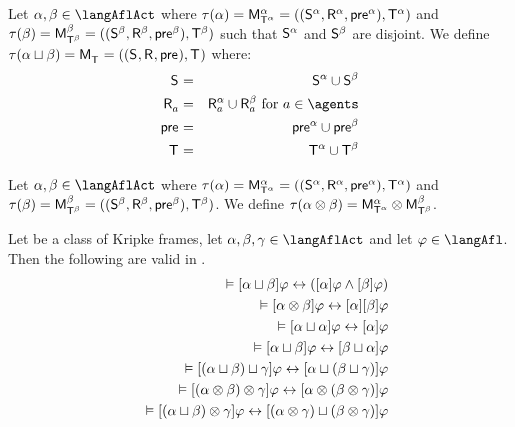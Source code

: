 \begin{definition}\label{afl-choice}
Let $\alpha, \beta \in \langAflAct$ where $\tau(\alpha) = \aPModel[\alpha]{\aStatesT[\alpha]} = \aPModelTuple[\alpha]{\aStatesT[\alpha]}$ and $\tau(\beta) = \aPModel[\beta]{\aStatesT[\beta]} = \aPModelTuple[\beta]{\aStatesT[\beta]}$ such that $\aStates[\alpha]$ and $\aStates[\beta]$ are disjoint.
We define $\tau(\alpha \choice \beta) = \aPModel{\aStatesT} = \aPModelTuple{\aStatesT}$ where:
\begin{eqnarray*}
    \aStates &=& \aStates[\alpha] \cup \aStates[\beta]\\
    \aAccessibility{\agentA} &=& \aAccessibility[\alpha]{\agentA} \cup \aAccessibility[\beta]{\agentA} \text{ for } \agentA \in \agents\\
    \aPrecondition &=& \aPrecondition[\alpha] \cup \aPrecondition[\beta]\\
    \aStatesT &=& \aStatesT[\alpha] \cup \aStatesT[\beta]
\end{eqnarray*}
\end{definition}

\begin{definition}\label{afl-sequential}
Let $\alpha, \beta \in \langAflAct$ where $\tau(\alpha) = \aPModel[\alpha]{\aStatesT[\alpha]} = \aPModelTuple[\alpha]{\aStatesT[\alpha]}$ and $\tau(\beta) = \aPModel[\beta]{\aStatesT[\beta]} = \aPModelTuple[\beta]{\aStatesT[\beta]}$.
We define $\tau(\alpha \compose \beta) = \aPModel[\alpha]{\aStatesT[\alpha]} \exec \aPModel[\beta]{\aStatesT[\beta]}$.
\end{definition}

\begin{proposition}\label{afl-choice-sequential-validities}
Let \classC{} be a class of Kripke frames, let $\alpha, \beta, \gamma \in \langAflAct$ and let $\phi \in \langAfl$. Then the following are valid in \logicAflC{}.
\begin{eqnarray*}
    &&\entails \actionA{\alpha \choice \beta} \phi \iff (\actionA{\alpha} \phi \land \actionA{\beta} \phi) \label{afl-axiom-choice}\\
    &&\entails \actionA{\alpha \compose \beta} \phi \iff \actionA{\alpha} \actionA{\beta} \phi \label{afl-axiom-sequential}\\
    &&\entails \actionA{\alpha \choice \alpha} \phi \iff \actionA{\alpha} \phi\\
    &&\entails \actionA{\alpha \choice \beta} \phi \iff \actionA{\beta \choice \alpha} \phi\\
    &&\entails \actionA{(\alpha \choice \beta) \choice \gamma} \phi \iff \actionA{\alpha \choice (\beta \choice \gamma)} \phi\\
    &&\entails \actionA{(\alpha \compose \beta) \compose \gamma} \phi \iff \actionA{\alpha \compose (\beta \compose \gamma)} \phi\\
    &&\entails \actionA{(\alpha \choice \beta) \compose \gamma} \phi \iff \actionA{(\alpha \compose \gamma) \choice (\beta \compose \gamma)} \phi
\end{eqnarray*}
\end{proposition}

